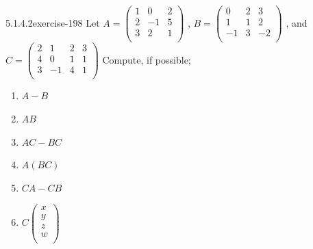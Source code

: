 \documentclass[twoside,10pt,]{book}
\numberwithin{equation}{section}
\begin{document}
\begin{divisionsolution}{5.1.4.2}{}{exercise-198}%
\hypertarget{p-1757}{}%
Let \(A = \left(
\begin{array}{ccc}
1 & 0 & 2 \\
2 & -1 & 5 \\
3 & 2 & 1 \\
\end{array}
\right)\) , \(B =\left(
\begin{array}{ccc}
0 & 2 & 3 \\
1 & 1 & 2 \\
-1 & 3 & -2 \\
\end{array}
\right)\) , and \(C=\left(
\begin{array}{cccc}
2 & 1 & 2 & 3 \\
4 & 0 & 1 & 1 \\
3 & -1 & 4 & 1 \\
\end{array}
\right)\) Compute, if possible;%
\par
\hypertarget{p-1758}{}%
\leavevmode%
\begin{multicols}{2}
\begin{enumerate}[label=(\alph*)]
\item\hypertarget{li-926}{}\hypertarget{p-1759}{}%
\(A - B\)%
\item\hypertarget{li-927}{}\hypertarget{p-1760}{}%
\(A B\)%
\item\hypertarget{li-928}{}\hypertarget{p-1761}{}%
\(A C - B C\)%
\item\hypertarget{li-929}{}\hypertarget{p-1762}{}%
\(A(B C)\)%
\item\hypertarget{li-930}{}\hypertarget{p-1763}{}%
\(C A - C B\)%
\item\hypertarget{li-931}{}\hypertarget{p-1764}{}%
\(C \left(
\begin{array}{c}
x \\
y \\
z \\
w \\
\end{array}
\right)\)%
\end{enumerate}
\end{multicols}
%
\end{divisionsolution}%
\end{document}
